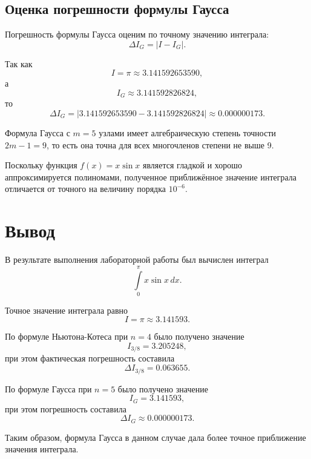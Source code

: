 \subsection{Оценка погрешности формулы Гаусса}

Погрешность формулы Гаусса оценим по точному значению интеграла:
\[
\Delta I_G=|I-I_G|.
\]

Так как
\[
I=\pi\approx3.141592653590,
\]
а
\[
I_G\approx3.141592826824,
\]
то
\[
\Delta I_G=|3.141592653590-3.141592826824|\approx0.000000173.
\]

Формула Гаусса с $m = 5$ узлами имеет алгебраическую степень точности $2m - 1 = 9$, то есть она точна для всех многочленов степени не выше 9.

Поскольку функция $f(x) = x \sin x$ является гладкой и хорошо аппроксимируется полиномами, полученное приближённое значение интеграла отличается от точного на величину порядка $10^{-6}$.

\section{Вывод}

В результате выполнения лабораторной работы был вычислен интеграл
\[
\int\limits_0^{\pi}x\sin x\,dx.
\]

Точное значение интеграла равно
\[
I=\pi\approx3.141593.
\]

По формуле Ньютона-Котеса при $n=4$ было получено значение
\[
I_{3/8}=3.205248,
\]
при этом фактическая погрешность составила
\[
\Delta I_{3/8}=0.063655.
\]

По формуле Гаусса при $n=5$ было получено значение
\[
I_G=3.141593,
\]
при этом погрешность составила
\[
\Delta I_G\approx0.000000173.
\]

Таким образом, формула Гаусса в данном случае дала более точное приближение значения интеграла.
